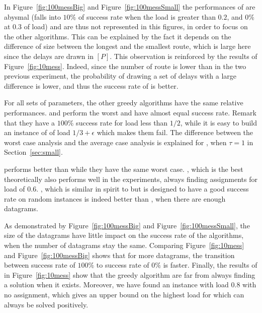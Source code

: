 \vspace{1cm}

In Figure~\ref{fig:100messBig} and Figure~\ref{fig:100messSmall} the performances of \shortestlongest are abysmal (falls into $10\%$ of success rate when the load is greater than $0.2$, and $0\%$ at $0.3$ of load) and are thus not represented in this figures, in order to focus on the other algorithms. This can be explained by the fact it depends on the difference of size between the longest and the smallest route, which is large here since the delays are drawn in $[P]$. This observation is reinforced by the results of Figure~\ref{fig:10mess}. Indeed, since the number of route is lower than in the two previous experiment, the probability of drawing a set of delays with a large difference is lower, and thus the success rate of \shortestlongest is better. 

For all sets of parameters, the other greedy algorithms have the same relative performances. \metaoffset and \greedyuniform
perform the worst and have almost equal success rate. Remark that they have a $100\%$ success rate for load
less than $1/2$, while it is easy to build an instance of \pma of load $1/3 +\epsilon$ which makes them fail. 
The difference between the worst case analysis and the average case analysis is explained for \greedyuniform, when $\tau = 1$ in Section~\ref{sec:small}.

\firstfit performs better than \metaoffset while they have the same worst case. \compactpair, which is the best theoretically also performs well in the experiments, always finding assignments for load of $0.6$.  \compactfit, which is similar in spirit to \compactpair but is designed to have a good success rate on random instances is indeed better than  \compactpair, when there are enough datagrams.

As demonstrated by Figure~\ref{fig:100messBig} and Figure~\ref{fig:100messSmall}, the size of the datagrams have little impact on the success rate of the algorithms, when the number of datagrams stay the same. Comparing Figure~\ref{fig:10mess} and Figure~\ref{fig:100messBig} shows that for more datagrams, the transition between success rate of $100\%$ to success rate of $0\%$ is faster.
Finally, the results of \ESCA in Figure~\ref{fig:10mess} show that the greedy algorithm are far from always finding a solution when it exists. Moreover, we have found an instance with load $0.8$ with no assignment, which gives an upper bound on the highest load for which \pma can always be solved positively.

